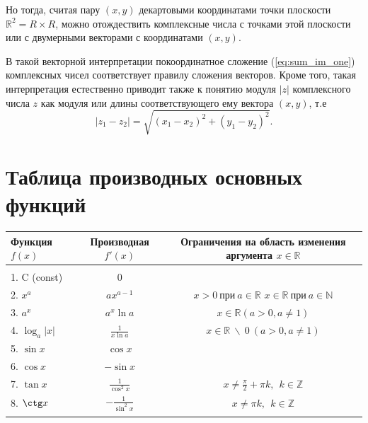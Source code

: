 \documentclass[a4paper, 12pt]{article} %
\begin{document}
\begin{enumerate}
          Но тогда, считая пару $(x, y)$ декартовыми координатами точки плоскости $\mathbb{R}^2 = R \times R$, можно отождествить комплексные числа с точками этой плоскости или с двумерными векторами с координатами $(x, y)$.

          В такой векторной интерпретации покоординатное сложение (\ref{eq:sum_im_one}) комплексных чисел соответствует правилу сложения векторов. Кроме того, такая интерпретация естественно приводит также к понятию модуля $|z|$ комплексного числа $z$ как модуля или длины соответствующего ему вектора $(x, y)$, т.е
          \begin{equation}
              |z_1 - z_2| = \sqrt{(x_1 - x_2)^2 + (y_1 - y_2)^2}.
          \end{equation}
\end{enumerate}

\clearpage
\section*{Таблица производных основных функций}
\begin{center}
    \begin{tabular}{ | l | c | c | }
        \hline
        Функция $f(x)$  & Производная $f'(x)$    & Ограничения на область изменения аргумента $x \in \mathbb{R}$                                       \\ \hline & & \\
        1. C (const)    & 0                      & ~~                                                                                                  \\
        2. $x^a$        & $ax^{a - 1}$           & $x > 0 \ \text{при} \ a \in \mathbb{R}$ \newline $x \in \mathbb{R} \ \text{при} \ a \in \mathbb{N}$ \\
        3. $a^x$        & $a^x \ln a$            & $x \in \mathbb{R} (a > 0, a \neq 1)$                                                                \\
        4. $\log_a |x|$ & $\frac{1}{x \ln a}$    & $x \in \mathbb{R} \ \backslash \ 0 \ (a > 0, a \neq 1)$                                             \\
        5. $\sin x$     & $\cos x$               & ~~                                                                                                  \\
        6. $\cos x$     & $-\sin x$              & ~~                                                                                                  \\
        7. $\tan x$     & $\frac{1}{\cos^2 x}$   & $x \neq \frac{\pi}{2} + \pi k, \ \ k \in \mathbb{Z}$                                                \\
        8. $\ctg x$     & $- \frac{1}{\sin^2 x}$ & $x \neq \pi k, \ \ k \in \mathbb{Z}$                                                                \\ & & \\ \hline
    \end{tabular}
\end{center}
\end{document}

